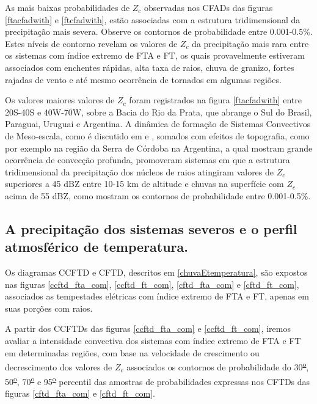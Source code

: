 As mais baixas probabilidades de $Z_c$ observadas nos CFADs das figuras \ref{ftacfadwith} e \ref{ftcfadwith}, estão associadas com a estrutura tridimensional da precipitação mais severa. Observe os contornos de probabilidade entre 0.001-0.5\%. Estes níveis de contorno revelam os valores de $Z_c$ da precipitação mais rara entre os sistemas com índice extremo de FTA e FT, os quais provavelmente estiveram associados com enchentes rápidas, alta taxa de raios, chuva de granizo, fortes rajadas de vento e até mesmo ocorrência de tornados em algumas regiões. 

Os valores maiores valores de $Z_c$ foram registrados na figura \ref{ftacfadwith} entre 20S-40S e 40W-70W, sobre a Bacia do Rio da Prata, que abrange o Sul do Brasil, Paraguai, Uruguai e Argentina. A dinâmica de formação de Sistemas Convectivos de Meso-escala, como é discutido em \cite{Velasco1987} e \cite{Durkee2009}, somados com efeitos de topografia, como por exemplo na região da Serra de Córdoba na Argentina, a qual \cite{Rasmussen2011} mostram grande ocorrência de convecção profunda, promoveram sistemas em que a estrutura tridimensional da precipitação dos núcleos de raios atingiram valores de $Z_c$ superiores a 45 dBZ entre 10-15 km de altitude e chuvas na superfície com $Z_c$ acima de 55 dBZ, como mostram os contornos de probabilidade entre 0.001-0.5\%.





\subsection{A precipitação dos sistemas severos e o perfil atmosférico de temperatura.}

Os diagramas CCFTD e CFTD, descritos em \ref{chuvaEtemperatura}, são expostos nas figuras \ref{ccftd_fta_com}, \ref{ccftd_ft_com}, \ref{cftd_fta_com} e \ref{cftd_ft_com}, associados as tempestades elétricas com índice extremo de FTA e FT, apenas em suas porções com raios.

A partir dos CCFTDs das figuras \ref{ccftd_fta_com} e \ref{ccftd_ft_com}, iremos avaliar a intensidade convectiva dos sistemas com índice extremo de FTA e FT em determinadas regiões, com base na velocidade de crescimento ou decrescimento dos valores de $Z_{c}$ associados os contornos de probabilidade do 30\textsuperscript{\underline{o}}, 50\textsuperscript{\underline{o}}, 70\textsuperscript{\underline{o}} e 95\textsuperscript{\underline{o}} percentil das amostras de probabilidades expressas nos CFTDs das figuras \ref{cftd_fta_com} e \ref{cftd_ft_com}.	


